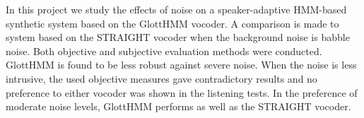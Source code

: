 \begin{abstractpage}[english]
In this project we study the effects of noise on a speaker-adaptive HMM-based synthetic system based on the GlottHMM vocoder.
%
A comparison is made to system based on the STRAIGHT vocoder when the background noise is babble noise.
%
Both objective and subjective evaluation methods were conducted.
%
GlottHMM is found to be less robust against severe noise.
%
When the noise is less intrusive, the used objective measures gave contradictory results and no preference to either vocoder was shown in the listening tests.
%
In the preference of moderate noise levels, GlottHMM performs as well as the STRAIGHT vocoder. 
\end{abstractpage}
